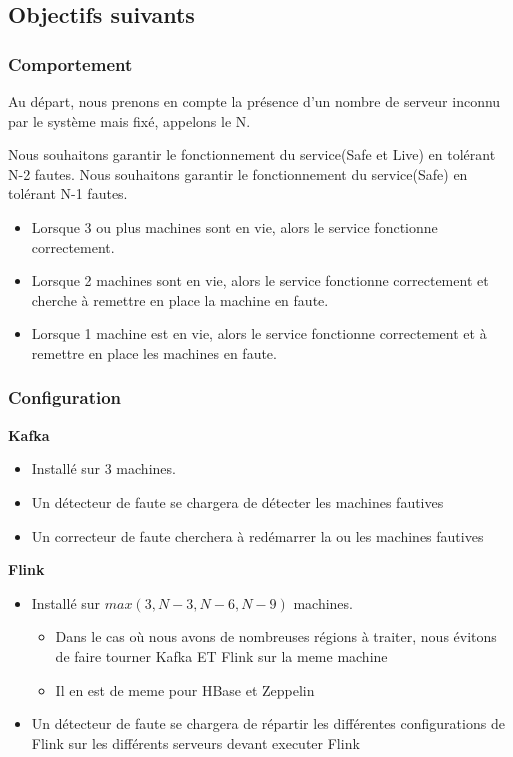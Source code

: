 \documentclass[a4paper,oneside,10pt]{article}
\begin{document}
\subsection{Objectifs suivants}

\subsubsection{Comportement}

Au départ, nous prenons en compte la présence d'un nombre de serveur inconnu par le système mais fixé, appelons le N.

Nous souhaitons garantir le fonctionnement du service(Safe et Live) en tolérant N-2 fautes.
Nous souhaitons garantir le fonctionnement du service(Safe) en tolérant N-1 fautes. 

\begin{itemize}
	\item Lorsque 3 ou plus machines sont en vie, alors le service fonctionne correctement.
	\item Lorsque 2 machines sont en vie, alors le service fonctionne correctement et cherche à remettre en place la machine en faute.
	\item Lorsque 1 machine est en vie, alors le service fonctionne correctement et à remettre en place les machines en faute. 
\end{itemize}


\subsubsection{Configuration}


\textbf{Kafka}
\begin{itemize}
	\item Installé sur 3 machines. 
	\item Un détecteur de faute se chargera de détecter les machines fautives
	\item Un correcteur de faute cherchera à redémarrer la ou les machines fautives
\end{itemize}

\textbf{Flink}
\begin{itemize}
	\item Installé sur $max(3, N-3, N-6, N-9)$ machines. 
	\begin{itemize}
		\item Dans le cas où nous avons de nombreuses régions à traiter, nous évitons de faire tourner Kafka ET Flink sur la meme machine
		\item Il en est de meme pour HBase et Zeppelin
	\end{itemize}
	\item Un détecteur de faute se chargera de répartir les différentes configurations de Flink sur les différents serveurs devant executer Flink
\end{itemize}
\end{document}
